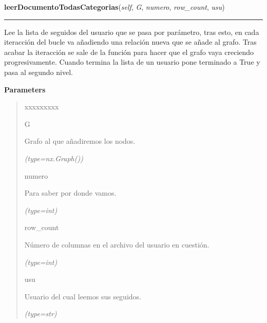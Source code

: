 \hspace{.8\funcindent}\begin{boxedminipage}{\funcwidth}

    \raggedright \textbf{leerDocumentoTodasCategorias}(\textit{self}, \textit{G}, \textit{numero}, \textit{row\_count}, \textit{usu})

    \vspace{-1.5ex}

    \rule{\textwidth}{0.5\fboxrule}
\setlength{\parskip}{2ex}
    Lee la lista de seguidos del usuario que se pasa por parámetro, tras 
    esto, en cada iteracción del bucle va añadiendo una relación nueva que 
    se añade al grafo. Tras acabar la iteracción se sale de la función para
    hacer que el grafo vaya creciendo progresivamente. Cuando termina la 
    lista de un usuario pone terminado a True y pasa al segundo nivel.

\setlength{\parskip}{1ex}
      \textbf{Parameters}
      \vspace{-1ex}

      \begin{quote}
        \begin{Ventry}{xxxxxxxxx}

          \item[G]

          Grafo al que añadiremos los nodos.

            {\it (type=nx.Graph())}

          \item[numero]

          Para saber por donde vamos.

            {\it (type=int)}

          \item[row\_count]

          Número de columnas en el archivo del usuario en cuestión.

            {\it (type=int)}

          \item[usu]

          Usuario del cual leemos sus seguidos.

            {\it (type=str)}

        \end{Ventry}

      \end{quote}

    \end{boxedminipage}


